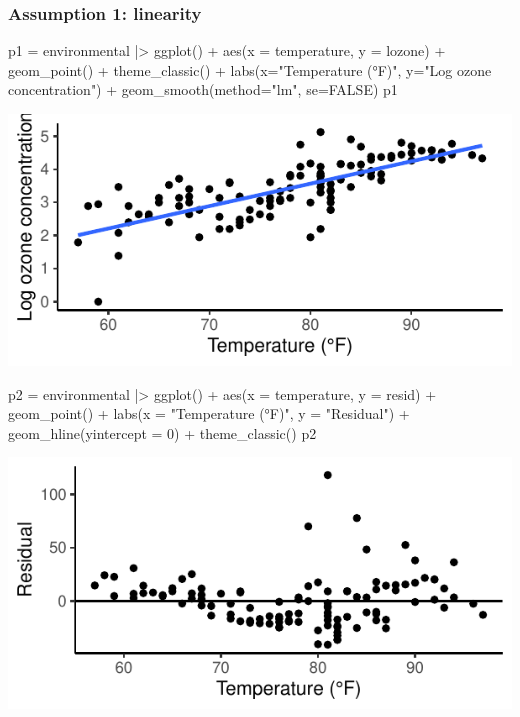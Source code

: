 \documentclass[a4paper]{article}
\begin{document}
\subsubsection{Assumption 1: linearity}
\begin{minipage}[t]{0.49\textwidth}
\begin{Schunk}
\begin{Sinput}
p1 = environmental |> ggplot() + 
  aes(x = temperature, y = lozone) + 
  geom_point() + 
  theme_classic() + 
  labs(x="Temperature (°F)",
       y="Log ozone concentration") +
  geom_smooth(method="lm", se=FALSE)
p1
\end{Sinput}


{\centering \includegraphics[width=\maxwidth]{figure/listings-unnamed-chunk-349-1} 

}

\end{Schunk}
\end{minipage}
\hspace{0.02\textwidth}
\begin{minipage}[t]{0.49\textwidth}
\begin{Schunk}
\begin{Sinput}
p2 = environmental |> ggplot() + 
  aes(x = temperature, y = resid) + 
  geom_point() + 
  labs(x = "Temperature (°F)",
       y = "Residual") +
  geom_hline(yintercept = 0) +
  theme_classic()
p2
\end{Sinput}


{\centering \includegraphics[width=\maxwidth]{figure/listings-unnamed-chunk-350-1} 

}

\end{Schunk}
\end{minipage}
\end{document}
